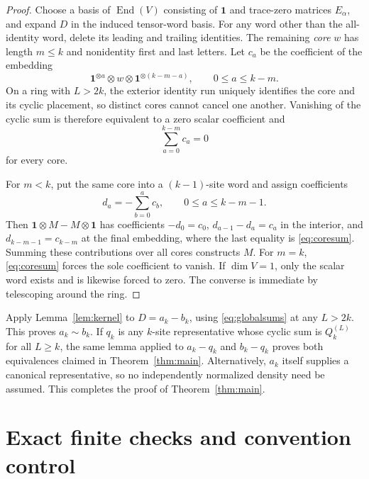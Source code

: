 \documentclass[11pt,a4paper]{article}
\theoremstyle{definition}
\theoremstyle{remark}
\newcommand{\End}{\operatorname{End}}
\begin{document}
\begin{proof}
Choose a basis of $\End(V)$ consisting of $\mathbf 1$ and trace-zero matrices
$E_\alpha$, and expand $D$ in the induced tensor-word basis.  For any word other than
the all-identity word, delete its leading and trailing identities.  The remaining
\emph{core} $w$ has length $m\leq k$ and nonidentity first and last letters.  Let
$c_a$ be the coefficient of the embedding
\begin{equation}
 \mathbf 1^{\otimes a}\otimes w\otimes
 \mathbf 1^{\otimes(k-m-a)},\qquad 0\leq a\leq k-m.
\end{equation}
On a ring with $L>2k$, the exterior identity run uniquely identifies the core and its
cyclic placement, so distinct cores cannot cancel one another.  Vanishing of the cyclic
sum is therefore equivalent to a zero scalar coefficient and
\begin{equation}
 \sum_{a=0}^{k-m}c_a=0
 \label{eq:coresum}
\end{equation}
for every core.

For $m<k$, put the same core into a $(k-1)$-site word and assign coefficients
\begin{equation}
 d_a=-\sum_{b=0}^{a}c_b,\qquad 0\leq a\leq k-m-1.
 \label{eq:partialsums}
\end{equation}
Then $\mathbf 1\otimes M-M\otimes\mathbf 1$ has coefficients
$-d_0=c_0$, $d_{a-1}-d_a=c_a$ in the interior, and
$d_{k-m-1}=c_{k-m}$ at the final embedding, where the last equality is
\eqref{eq:coresum}.  Summing these contributions over all cores constructs $M$.
For $m=k$, \eqref{eq:coresum} forces the sole coefficient to vanish.  If
$\dim V=1$, only the scalar word exists and is likewise forced to zero.  The converse
is immediate by telescoping around the ring.
\end{proof}

Apply Lemma~\ref{lem:kernel} to $D=a_k-b_k$, using \eqref{eq:globalsums} at any
$L>2k$.  This proves $a_k\sim b_k$.  If $q_k$ is any $k$-site representative whose
cyclic sum is $Q_k^{(L)}$ for all $L\geq k$, the same lemma applied to $a_k-q_k$ and
$b_k-q_k$ proves both equivalences claimed in Theorem~\ref{thm:main}.  Alternatively,
$a_k$ itself supplies a canonical representative, so no independently normalized
density need be assumed.  This completes the proof of Theorem~\ref{thm:main}.

\section{Exact finite checks and convention control}
\end{document}
